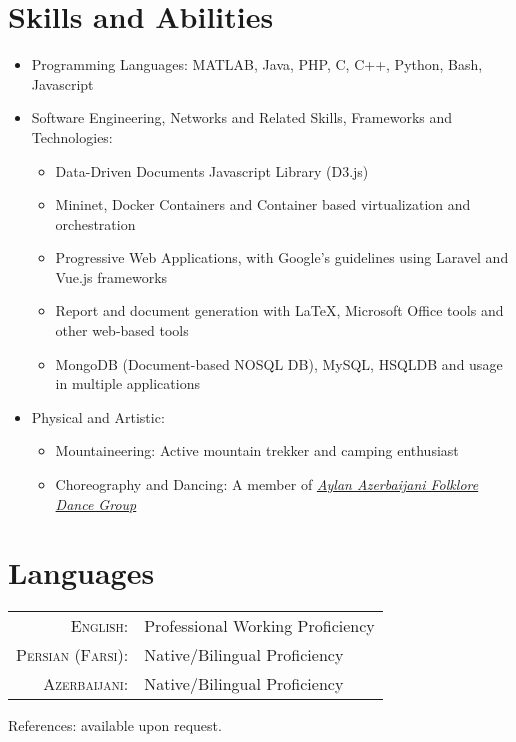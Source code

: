 \documentclass[a4paper,10pt]{article}
\begin{document}
\section{Skills and Abilities}
    \begin{itemize}
        \item Programming Languages: MATLAB, Java, PHP, C, C++, Python, Bash, Javascript
        \item Software Engineering, Networks and Related Skills, Frameworks and Technologies:
            \begin{itemize}
                \item Data-Driven Documents Javascript Library (D3.js)
                
                \item Mininet, Docker Containers and Container based virtualization and orchestration
                
                \item Progressive Web Applications, with Google's guidelines using Laravel and Vue.js frameworks
                
                \item Report and document generation with \LaTeX{}, Microsoft Office tools and other web-based tools
                
                \item MongoDB (Document-based NOSQL DB), MySQL, HSQLDB and usage in multiple applications
                
            \end{itemize}
        
        \item Physical and Artistic:
            \begin{itemize}
                \item Mountaineering: Active mountain trekker and camping enthusiast
                
                
                \item Choreography and Dancing: A member of \emph{\href{https://aylandance.com}{Aylan Azerbaijani Folklore Dance Group}}
            \end{itemize}
    \end{itemize}
    
\section{Languages}
\begin{tabular}{rl}
    \textsc{English:}&Professional Working Proficiency\\
    \textsc{Persian (Farsi):}&Native/Bilingual Proficiency\\
    \textsc{Azerbaijani:}&Native/Bilingual Proficiency\\
\end{tabular}

References: available upon request.

\newpage

\end{document}
